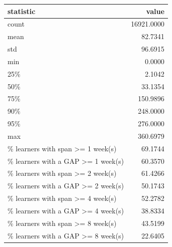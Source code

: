 \begin{tabular}{lr}
\toprule
statistic & value \\
\midrule
count & 16921.0000 \\
mean & 82.7341 \\
std & 96.6915 \\
min & 0.0000 \\
25\% & 2.1042 \\
50\% & 33.1354 \\
75\% & 150.9896 \\
90\% & 248.0000 \\
95\% & 276.0000 \\
max & 360.6979 \\
\% learners with span >= 1 week(s) & 69.1744 \\
\% learners with a GAP >= 1 week(s) & 60.3570 \\
\% learners with span >= 2 week(s) & 61.4266 \\
\% learners with a GAP >= 2 week(s) & 50.1743 \\
\% learners with span >= 4 week(s) & 52.2782 \\
\% learners with a GAP >= 4 week(s) & 38.8334 \\
\% learners with span >= 8 week(s) & 43.5199 \\
\% learners with a GAP >= 8 week(s) & 22.6405 \\
\bottomrule
\end{tabular}
